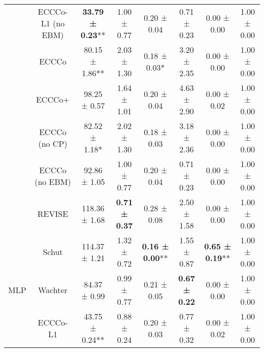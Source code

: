 \begin{table}
{\begin{tabular}[t]{cccccccc}
 & ECCCo-L1 (no EBM) & \textbf{33.79 ± 0.23}** & 1.00 ± 0.77\hphantom{*}\hphantom{*} & 0.20 ± 0.04\hphantom{*}\hphantom{*} & 0.71 ± 0.23\hphantom{*}\hphantom{*} & 0.00 ± 0.00\hphantom{*}\hphantom{*} & 1.00 ± 0.00\hphantom{*}\hphantom{*}\\

 & ECCCo & 80.15 ± 1.86** & 2.03 ± 1.30\hphantom{*}\hphantom{*} & 0.18 ± 0.03*\hphantom{*} & 3.20 ± 2.35\hphantom{*}\hphantom{*} & 0.00 ± 0.00\hphantom{*}\hphantom{*} & 1.00 ± 0.00\hphantom{*}\hphantom{*}\\

 & ECCCo+ & 98.25 ± 0.57\hphantom{*}\hphantom{*} & 1.64 ± 1.01\hphantom{*}\hphantom{*} & 0.20 ± 0.04\hphantom{*}\hphantom{*} & 4.63 ± 2.90\hphantom{*}\hphantom{*} & 0.00 ± 0.02\hphantom{*}\hphantom{*} & 1.00 ± 0.00\hphantom{*}\hphantom{*}\\

 & ECCCo (no CP) & 82.52 ± 1.18*\hphantom{*} & 2.02 ± 1.30\hphantom{*}\hphantom{*} & 0.18 ± 0.03\hphantom{*}\hphantom{*} & 3.18 ± 2.36\hphantom{*}\hphantom{*} & 0.00 ± 0.00\hphantom{*}\hphantom{*} & 1.00 ± 0.00\hphantom{*}\hphantom{*}\\

 & ECCCo (no EBM) & 92.86 ± 1.05\hphantom{*}\hphantom{*} & 1.00 ± 0.77\hphantom{*}\hphantom{*} & 0.20 ± 0.04\hphantom{*}\hphantom{*} & 0.71 ± 0.23\hphantom{*}\hphantom{*} & 0.00 ± 0.00\hphantom{*}\hphantom{*} & 1.00 ± 0.00\hphantom{*}\hphantom{*}\\

 & REVISE & 118.36 ± 1.68\hphantom{*}\hphantom{*} & \textbf{0.71 ± 0.37}\hphantom{*}\hphantom{*} & 0.28 ± 0.08\hphantom{*}\hphantom{*} & 2.50 ± 1.58\hphantom{*}\hphantom{*} & 0.00 ± 0.00\hphantom{*}\hphantom{*} & 1.00 ± 0.00\hphantom{*}\hphantom{*}\\

 & Schut & 114.37 ± 1.21\hphantom{*}\hphantom{*} & 1.32 ± 0.72\hphantom{*}\hphantom{*} & \textbf{0.16 ± 0.00}** & 1.55 ± 0.87\hphantom{*}\hphantom{*} & \textbf{0.65 ± 0.19}** & 1.00 ± 0.00\hphantom{*}\hphantom{*}\\

\multirow[t]{-10}{*}{\centering\arraybackslash MLP} & Wachter & 84.37 ± 0.99\hphantom{*}\hphantom{*} & 0.99 ± 0.77\hphantom{*}\hphantom{*} & 0.21 ± 0.05\hphantom{*}\hphantom{*} & \textbf{0.67 ± 0.22}\hphantom{*}\hphantom{*} & 0.00 ± 0.00\hphantom{*}\hphantom{*} & 1.00 ± 0.00\hphantom{*}\hphantom{*}\\
\cmidrule{1-8}
 & ECCCo-L1 & 43.75 ± 0.24** & 0.88 ± 0.24\hphantom{*}\hphantom{*} & 0.20 ± 0.03\hphantom{*}\hphantom{*} & 0.77 ± 0.32\hphantom{*}\hphantom{*} & 0.00 ± 0.02\hphantom{*}\hphantom{*} & 1.00 ± 0.00\hphantom{*}\hphantom{*}\\


\end{tabular}}
\end{table}
